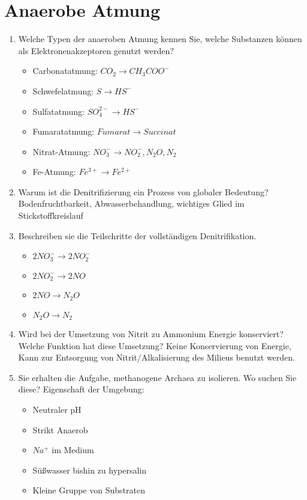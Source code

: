 
\section{Anaerobe Atmung}
\begin{enumerate}
	\item Welche Typen der anaeroben Atmung kennen Sie, welche Substanzen können als Elektronenakzeptoren genutzt werden? 
		\begin{itemize}
			\item Carbonatatmung: $CO_2 \rightarrow CH_3COO^-$
			\item Schwefelatmung: $S \rightarrow HS^-$
			\item Sulfatatmung:   $SO_4^{2-} \rightarrow HS^-$
			\item Fumaratatmung:  $Fumarat \rightarrow Succinat$
			\item Nitrat-Atmung:  $NO_3^- \rightarrow NO_2^-, N_2O, N_2$
			\item Fe-Atmung:      $Fe^{3+} \rightarrow Fe^{2+}$
		\end{itemize}
	\item Warum ist die Denitrifizierung ein Prozess von globaler Bedeutung?
		Bodenfruchtbarkeit, Abwasserbehandlung, wichtiges Glied im Stickstoffkreislauf
	\item Beschreiben sie die Teilschritte der vollständigen Denitrifikation.
		\begin{itemize}
			\item $2NO_3^- \rightarrow 2 NO_2^-$
			\item $2 NO_2^- \rightarrow 2 NO$
			\item $2 NO \rightarrow N_2O$
			\item $N_2O \rightarrow N_2$
		\end{itemize}
	\item Wird bei der Umsetzung von Nitrit zu Ammonium Energie konserviert? Welche Funktion hat diese Umsetzung? Keine Konservierung von Energie, Kann zur Entsorgung von Nitrit/Alkalisierung des Milieus benutzt werden.	

	\item Sie erhalten die Aufgabe, methanogene Archaea zu isolieren. Wo suchen Sie diese?
		Eigenschaft der Umgebung: \\
		\begin{itemize}
			\item Neutraler pH
			\item Strikt Anaerob
			\item $Na^+$ im Medium
			\item S\"ußwasser bishin zu hypersalin
			\item Kleine Gruppe von Substraten
		\end{itemize}


\end{enumerate}
